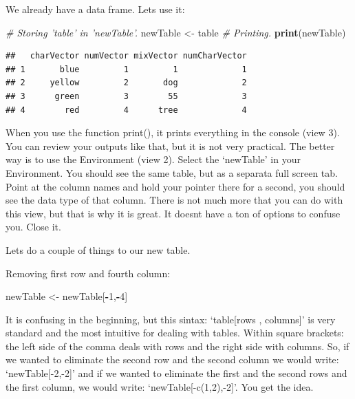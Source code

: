 \documentclass[]{book}
\newenvironment{Shaded}{\begin{snugshade}}{\end{snugshade}}
\newcommand{\CommentTok}[1]{\textcolor[rgb]{0.56,0.35,0.01}{\textit{#1}}}
\newcommand{\DecValTok}[1]{\textcolor[rgb]{0.00,0.00,0.81}{#1}}
\newcommand{\KeywordTok}[1]{\textcolor[rgb]{0.13,0.29,0.53}{\textbf{#1}}}
\newcommand{\NormalTok}[1]{#1}
\newcommand{\OperatorTok}[1]{\textcolor[rgb]{0.81,0.36,0.00}{\textbf{#1}}}
\newcommand{\StringTok}[1]{\textcolor[rgb]{0.31,0.60,0.02}{#1}}
\begin{document}
We already have a data frame. Lets use it:

\begin{Shaded}
\begin{Highlighting}[]
\CommentTok{# Storing 'table' in 'newTable'.}
\NormalTok{newTable <-}\StringTok{ }\NormalTok{table}
\CommentTok{# Printing.}
\KeywordTok{print}\NormalTok{(newTable)}
\end{Highlighting}
\end{Shaded}

\begin{verbatim}
##   charVector numVector mixVector numCharVector
## 1       blue         1         1             1
## 2     yellow         2       dog             2
## 3      green         3        55             3
## 4        red         4      tree             4
\end{verbatim}

When you use the function print(), it prints everything in the console (view 3). You can review your outputs like that, but it is not very practical. The better way is to use the Environment (view 2). Select the `newTable' in your Environment. You should see the same table, but as a separata full screen tab. Point at the column names and hold your pointer there for a second, you should see the data type of that column. There is not much more that you can do with this view, but that is why it is great. It doesnt have a ton of options to confuse you. Close it.

Lets do a couple of things to our new table.

Removing first row and fourth column:

\begin{Shaded}
\begin{Highlighting}[]
\NormalTok{newTable <-}\StringTok{ }\NormalTok{newTable[}\OperatorTok{-}\DecValTok{1}\NormalTok{,}\OperatorTok{-}\DecValTok{4}\NormalTok{]}
\end{Highlighting}
\end{Shaded}

It is confusing in the beginning, but this sintax: `table{[}rows , columns{]}' is very standard and the most intuitive for dealing with tables. Within square brackets: the left side of the comma deals with rows and the right side with columns. So, if we wanted to eliminate the second row and the second column we would write: `newTable{[}-2,-2{]}' and if we wanted to eliminate the first and the second rows and the first column, we would write: `newTable{[}-c(1,2),-2{]}'. You get the idea.
\end{document}
